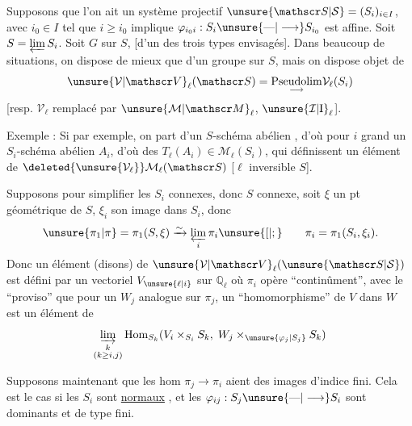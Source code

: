 Supposons que l'on ait un système projectif $\unsure{\mathscr S|\mathcal S}=(S_i)_{i\in I}$, avec $i_0\in I$ tel que $i\geq i_0$ implique $\varphi_{i_0i}:S_i\unsure{\text{---}|\longrightarrow}S_{i_0}$ est affine. Soit $S=\varprojlim S_i$. Soit $G$ sur $S$, [d'un des trois types envisagés]. Dans beaucoup de situations, on dispose de mieux que d'un groupe sur $S$, mais on dispose  objet de
\[
\unsure{\mathcal V|\mathscr V}_\ell(\mathscr S)=\underset{\longrightarrow}{\operatorname{Pseudolim}}\mathcal V_\ell(S_i)
\]
[resp.  $\mathcal V_\ell$ remplacé par $\unsure{\mathcal M|\mathscr M}_\ell$, $\unsure{\mathcal I|\mathrm I}_\ell$].

Exemple : Si par exemple, on part d'un  $S$-schéma abélien , d'où pour $i$ grand un $S_i$-schéma abélien $A_i$, d'où des $T_\ell(A_i)\in\mathcal M_\ell(S_i)$, qui définissent un élément de $\deleted{\unsure{\mathcal V_\ell}}\mathcal M_\ell(\mathscr S)$ [$\ell$ inversible  $S$].

Supposons pour simplifier les $S_i$ connexes, donc $S$ connexe, soit $\xi$ un pt
géométrique de $S$, $\xi_i$ son image dans $S_i$, donc
\[
\unsure{\pi_1|\pi}=\pi_1(S,\xi)\xrightarrow{\sim}\varprojlim_i\pi_i\unsure{[|;}\qquad \pi_i=\pi_1(S_i,\xi_i).
\]
Donc un élément (disons) de $\unsure{\mathcal V|\mathscr V}_\ell(\unsure{\mathscr S|\mathcal S})$  est défini par un vectoriel $V_{\unsure{\ell|i}}$ sur $\mathbb Q_\ell$ où $\pi_i$ opère ``continûment'', avec le ``proviso'' que pour un $W_j$ analogue sur $\pi_j$, un ``homomorphisme'' de $V$ dans $W$ est un élément de
\[
\varinjlim_{\substack{k\\(k\geq i,j)}}\operatorname{Hom}_{S_k}(V_i\times_{S_i}S_k,\;W_j\times_{\unsure{\varphi_j|S_j}}S_k)
\]

\margin{\rule{0.4pt}{6\baselineskip}}
Supposons maintenant que  les  hom  $\pi_j\longrightarrow\pi_i$ aient des images d'indice fini. Cela est le cas si les $S_i$ sont \uline{normaux} , et les $\varphi_{ij}:S_j\unsure{\text{---}|\longrightarrow}S_i$ sont dominants et  de type fini.

